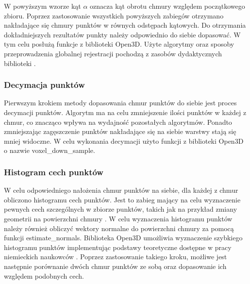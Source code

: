 W powyższym wzorze kąt $\alpha$ oznacza kąt obrotu chmury względem początkowego zbioru.
\newline \indent Poprzez zastosowanie wszystkich powyższych zabiegów otrzymano nakładające się chmury punktów w równych odstępach kątowych. Do otrzymania dokładniejszych rezultatów punkty należy odpowiednio do siebie dopasować. W tym celu posłużą funkcje z biblioteki Open3D. Użyte algorytmy oraz sposoby przeprowadzenia globalnej rejestracji pochodzą z zasobów dydaktycznych biblioteki \cite{FastRegistrationOpen3D}.
\subsubsection{Decymacja punktów}
Pierwszym krokiem metody dopasowania chmur punktów do siebie jest proces decymacji punktów. Algorytm ma na celu zmniejszenie ilości punktów w każdej z chmur, co znacząco wpływa na wydajność pozostałych algorytmów. Ponadto zmniejszając zagęszczenie punktów nakładające się na siebie warstwy stają się mniej widoczne. W celu wykonania decymacji użyto funkcji z biblioteki Open3D o nazwie voxel\_down\_sample. 
\subsubsection{Histogram cech punktów}
W celu odpowiedniego nałożenia chmur punktów na siebie, dla każdej z chmur obliczono histogramu cech punktów. Jest to zabieg mający na celu wyznaczenie pewnych cech szczególnych w zbiorze punktów, takich jak na przykład zmiany geometrii na powierzchni chmury \cite{warchol2016porownanie}. W celu wyznaczenia histogramu punktów należy również obliczyć wektory normalne do powierzchni chmury za pomocą funkcji estimate\_normals. Biblioteka Open3D umożliwia wyznaczenie szybkiego histogramu punktów implementując podstawy teoretyczne dostępne w pracy niemieckich naukowców \cite{rusu2009fast}. Poprzez zastosowanie takiego kroku, możliwe jest następnie porównanie dwóch chmur punktów ze sobą oraz dopasowanie ich względem podobnych cech.
